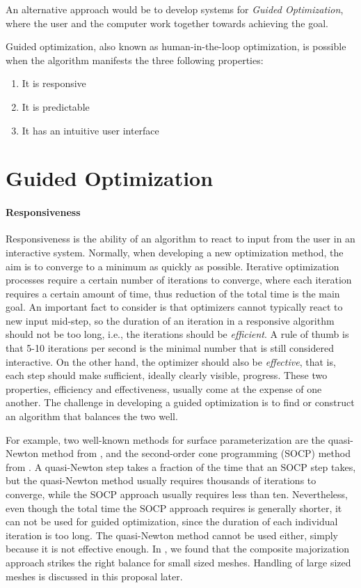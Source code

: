 \noindent An alternative approach would be to develop systems for \emph{Guided Optimization}, where the user and the computer work together towards achieving the goal.

\noindent Guided optimization, also known as human-in-the-loop optimization, is possible when the algorithm manifests the three following properties:
\begin{enumerate}
\item It is responsive
\item It is predictable
\item It has an intuitive user interface
\end{enumerate}

\section{Guided Optimization}
\paragraph*{Responsiveness}
Responsiveness is the ability of an algorithm to react to input from the user in an interactive system. Normally, when developing a new optimization method, the aim is to converge to a minimum as quickly as possible. Iterative optimization processes require a certain number of iterations to converge, where each iteration requires a certain amount of time, thus reduction of the total time is the main goal. An important fact to consider is that optimizers cannot typically react to new input mid-step, so the duration of an iteration in a responsive algorithm should not be too long, i.e., the iterations should be \emph{efficient}. A rule of thumb is that 5-10 iterations per second is the minimal number that is still considered interactive. On the other hand, the optimizer should also be \emph{effective}, that is, each step should make sufficient, ideally clearly visible, progress. These two properties, efficiency and effectiveness, usually come at the expense of one another. The challenge in developing a guided optimization is to find or construct an algorithm that balances the two well. 

For example, two well-known methods for surface parameterization are the quasi-Newton method from \cite{Smith:2015}, and the second-order cone programming (SOCP) method from \cite{Lipman:2012}. A quasi-Newton step takes a fraction of the time that an SOCP step takes, but the quasi-Newton method usually requires thousands of iterations to converge, while the SOCP approach usually requires less than ten. Nevertheless, even though the total time the SOCP approach requires is generally shorter, it can not be used for guided optimization, since the duration of each individual iteration is too long. The quasi-Newton method cannot be used either, simply because it is not effective enough. In \cite{Poranne:Autocuts:2017}, we found that the composite majorization approach strikes the right balance for small sized meshes. Handling of large sized meshes is discussed in this proposal later.

